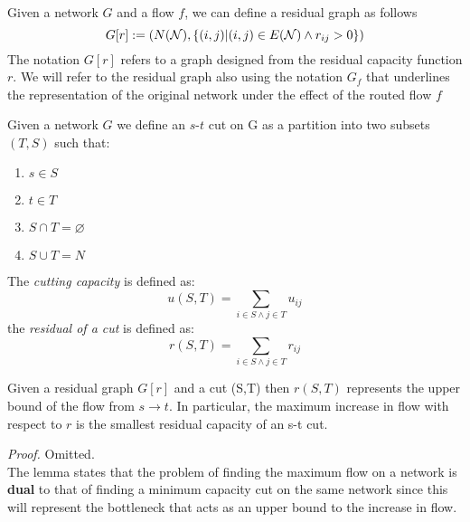 \begin{definition}
    Given a network $G$ and a flow $f$, we can define a residual graph as follows
    \[G[r] := (N(\mathcal{N}), \{(i,j) | (i,j)\in E(\mathcal{N}) \land r_{ij} > 0\})\]
    The notation $G[r]$ refers to a graph designed from the residual capacity function $r$. We will refer to the residual graph also using the notation $G_f$ that underlines the representation of the original network under the effect of the routed flow $f$
\end{definition}

\begin{definition}[s-t Cut]
    Given a network $G$ we define an $s$-$t$ cut on G as a partition into two subsets $(T, S)$ such that:
    \begin{enumerate}
        \item $s \in S$
        \item $t \in T$
        \item $S \cap T = \varnothing$
        \item $S \cup T = N$
    \end{enumerate}
    
    The \textit{cutting capacity} is defined as:
    \[u(S,T) = \sum_{i\in S\land j\in T} u_{ij}\]
    the \textit{residual of a cut} is defined as:
    \[r(S,T) = \sum_{i\in S\land j\in T} r_{ij}\]
\end{definition}

\begin{lemma}
    Given a residual graph $G[r]$ and a cut (S,T) then $r(S,T)$ represents the upper bound of the flow from $s \rightarrow t$.
In particular, the maximum increase in flow with respect to $r$ is the smallest residual capacity of an s-t cut.
\end{lemma}
\textit{Proof. }Omitted.\\

The lemma states that the problem of finding the maximum flow on a network is \textbf{dual} to that of finding a minimum capacity cut on the same network since this will represent the bottleneck that acts as an upper bound to the increase in flow.

